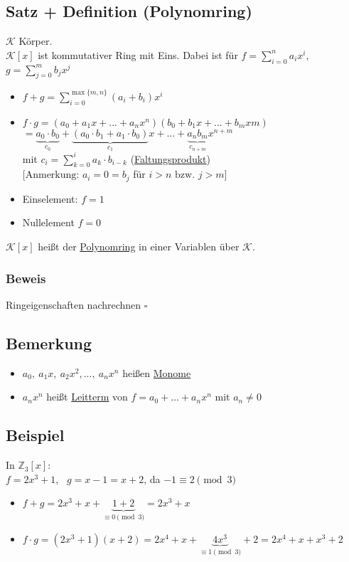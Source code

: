 \documentclass[a4paper, 12pt,titlepage, pdf, headsepline]{scrartcl}
\newcommand{\uline}[1]{\underline{#1}}
\newcommand{\qed}{\hfill$\square$}
\renewcommand{\>}{\rightarrow}
\renewcommand{\*}{\cdot}
\begin{document}
		      	\subsection{Satz + Definition (Polynomring)}
		      	$\mathcal{K}$ Körper.\\
		      	$\mathcal{K}[x]$ ist kommutativer Ring mit Eins. Dabei ist für $f = \sum_{i=0}^{n}a_ix^i,$\\$g = \sum_{j = 0}^{m} b_j x^j$
		      	\begin{itemize}
		      		\item $f+g = \sum_{i = 0}^{\max\{m,n\}} (a_i + b_i)x^i$
		      		\item $f \cdot g  = (a_0 + a_1x + ... + a_nx^n)(b_0 + b_1x + ... + b_mx m)$\\
		      		      \noindent\hspace*{8.5mm}$= \underbrace{a_0 \cdot b_0}_{c_0} + \underbrace{(a_0 \cdot b_1 + a_1 \cdot b_0)}_{c_1}x + ... + \underbrace{a_nb_m}_{c_{n+m}}x^{n+m}$\\
		      		      mit $c_i = \sum_{k = 0}^{i}a_k \cdot b_{i-k}$ (\uline{Faltungsprodukt})\\
		      		      $[\textrm{Anmerkung: }a_i = 0 = b_j$ für $i>n\textrm{ bzw. }j>m]$	
		      		\item Einselement: $f=1$
		      		\item Nullelement $f = 0$
		      	\end{itemize}
		      	$\mathcal{K}[x]$ heißt der \uline{Polynomring} in einer Variablen über $\mathcal{K}$.\\
		      	\subsubsection*{Beweis}
		      	Ringeigenschaften nachrechnen \qed
		      	\subsection{Bemerkung}
		      	\begin{itemize}
		      		\item $a_0,~a_1x,~a_2x^2,...,~a_nx^n$ heißen \uline{Monome}
		      		\item $a_nx^n$ heißt \uline{Leitterm} von $f= a_0 + ... + a_nx^n$ mit $ a_n \neq 0$
		      	\end{itemize}
		      	\subsection{Beispiel}
		      	In $\mathds{Z}_3[x]$: \\
		      	$f = 2x^3 +1,~~~ g = x-1 = x +2$, da $-1 \equiv 2\pmod 3$
		      	\begin{itemize}
		      		\item $f+g = 2x^3 + x + \underbrace{1+2}_{\equiv 0 \pmod 3} = 2x^3 + x$
		      		\item $f \cdot g = (2x^3 + 1)(x+2) = 2x^4 + x + \underbrace{4x^3}_{\equiv 1\pmod{3}} + 2 = 2x^4 + x + x^3 + 2$
		      	\end{itemize}
\end{document}
